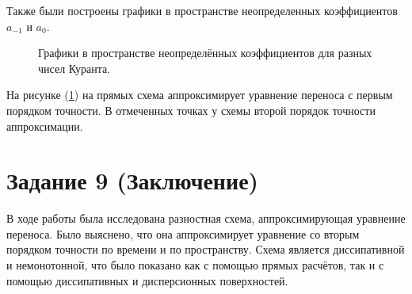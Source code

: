 \documentclass[a4paper, 14pt]{extreport}
\begin{document}
Также были построены графики в пространстве неопределенных коэффициентов $a_{-1}$ и $a_0$.
\begin{figure}[h]
\caption{Графики в пространстве неопределённых коэффициентов для разных чисел Куранта.}
\label{ris:undef_koeff_graph}
\end{figure}

\newpage
На рисунке (\ref{ris:undef_koeff_graph}) на прямых схема аппроксимирует уравнение переноса с первым порядком точности. В отмеченных точках у схемы второй порядок точности аппроксимации.

\newpage
\section*{Задание 9 (Заключение)}
В ходе работы была исследована разностная схема, аппроксимирующая уравнение переноса. Было выяснено, что она аппроксимирует уравнение со вторым порядком точности по времени и по пространству. Схема является диссипативной и немонотонной, что было показано как с помощью прямых расчётов, так и с помощью диссипативных и дисперсионных поверхностей. 
\end{document}

